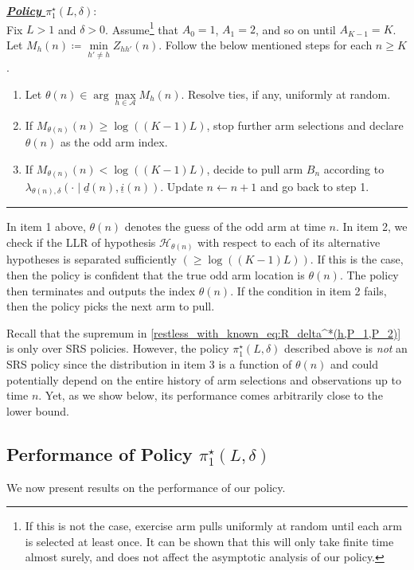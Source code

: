 \noindent \textbf{\underline{\emph{Policy }$\pi_{1}^{\star}(L,\delta)$}}:\\
\noindent Fix $L>1$ and $\delta>0$. Assume\footnote{If this is not the case, exercise arm pulls uniformly at random until each arm is selected at least once. It can be shown that this will only take finite time almost surely, and does not affect the asymptotic analysis of our policy.} that $A_0=1$, $A_1=2$, and so on until $A_{K-1}=K$. Let $M_h(n)\coloneqq\min\limits_{h'\neq h}Z_{hh'}(n)$. Follow the below mentioned steps for each $n\geq K$.
\begin{enumerate}
	\item Let $\theta(n)\in\arg\max\limits_{h\in\mathcal{A}}M_h(n)$. Resolve ties, if any, uniformly at random.
	\item If $M_{\theta(n)}(n)\geq\log((K-1)L)$, stop further arm selections and declare $\theta(n)$ as the odd arm index.
	\item If $M_{\theta(n)}(n)<\log((K-1)L)$, decide to pull arm $B_{n}$ according to $\lambda_{\theta(n),\delta}( \cdot \mid \underline{d}(n),\underline{i}(n))$. Update $n \leftarrow n+1$ and go back to step 1.
\end{enumerate}
\hrule
\vspace{0.1in}

In item 1 above, $\theta(n)$ denotes the guess of the odd arm at time $n$. In item 2, we check if the LLR of hypothesis $\mathcal{H}_{\theta(n)}$ with respect to each of its alternative hypotheses is separated sufficiently $(\geq \log((K-1)L))$. If this is the case, then the policy is confident that the true odd arm location is $\theta(n)$. The policy then terminates and outputs the index $\theta(n)$. If the condition in item 2 fails, then the policy picks the next arm to pull.

Recall that the supremum in \eqref{restless_with_known_eq:R_delta^*(h,P_1,P_2)} is only over SRS policies. However, the policy $\pi_1^\star(L,\delta)$ described above is \emph{not} an SRS policy since the distribution in item 3 is a function of $\theta(n)$ and could potentially depend on the entire history of arm selections and observations up to time $n$. Yet, as we show below, its performance comes arbitrarily close to the lower bound.

\subsection{Performance of Policy $\pi_1^\star(L,\delta)$}
We now present results on the performance of our policy.

